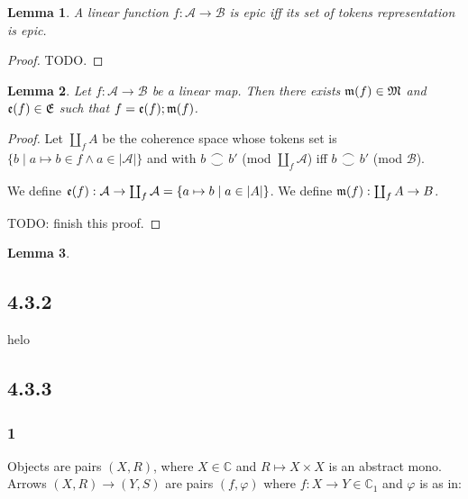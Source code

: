 \documentclass{article}
\newtheorem{lemma}{Lemma}
\newcommand{\consist}{\mathrel{\substack{\frown \\ \smile}}}
\begin{document}
\begin{lemma}
A linear function $f : \mathcal A \to \mathcal B$ is epic iff its set of tokens representation is epic.
\end{lemma}

\begin{proof}
TODO.
\end{proof}


\begin{lemma}
Let $f : \mathcal A \to \mathcal B$ be a linear map. Then there exists $\frak m(f) \in \frak M$
and $\frak e(f) \in \frak E$ such that $f = \frak e(f);\frak m(f)$.
\end{lemma}

\begin{proof}
Let $\coprod_f A$ be the coherence space whose tokens set is 
$\{ b \mid a \mapsto b \in f \wedge a \in |\mathcal A| \}$  
and with $b \consist b'$ (mod $\coprod_f \mathcal A$) iff 
$b \consist b'$ (mod $\mathcal B$).

We define $\frak e(f) : \mathcal A \to \coprod_f \mathcal A = \{ a \mapsto b \mid a \in |A| \}$.
We define $\frak m(f) : \coprod_f A \to B$.

TODO: finish this proof.
\end{proof}

\begin{lemma}

\end{lemma}


\subsection*{4.3.2}

helo

\subsection*{4.3.3}

\subsubsection*{1}

Objects are pairs $(X,R)$, where $X \in \mathbb C$ and $R \mapsto X \times X$ is an abstract mono.
Arrows $(X,R) \to (Y,S)$ are pairs $(f, \varphi)$ where $f : X \to Y \in \mathbb C_1$ and $\varphi$ is as in:
\begin{center}
\end{center} 
\end{document}
